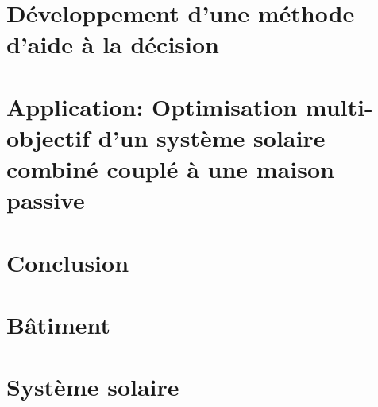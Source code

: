 \documentclass[11pt, oneside, fixOverflow]{JeremyThesis}
\begin{document}
\chapter{Développement d’une méthode d’aide à la décision}
% 

\chapter{Application: Optimisation multi-objectif d’un système solaire combiné couplé à une maison passive}
% 

\chapter*{Conclusion}
% 


\newpage
\addappheadtotoc
\appendix
\appendixpage
\chapter{Bâtiment}


\chapter{Système solaire}



\newpage
\printbibliography[title={Bibliographie}]
\end{document}
